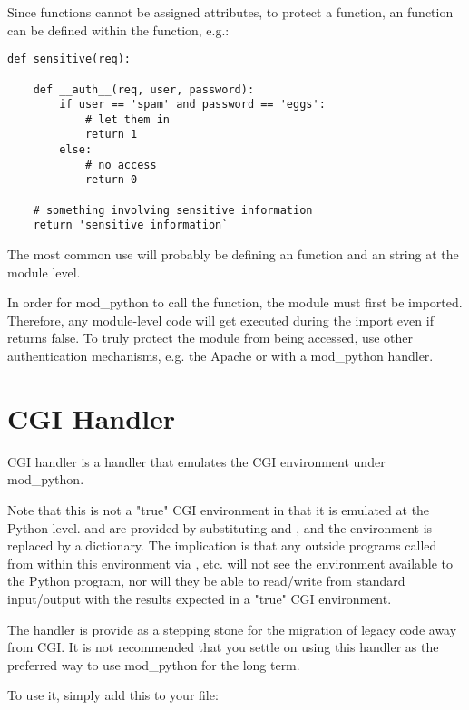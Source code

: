 Since functions cannot be assigned attributes, to protect a function,
an  function can be defined within the function, e.g.:

\begin{verbatim}
def sensitive(req):

    def __auth__(req, user, password):
        if user == 'spam' and password == 'eggs':
            # let them in
            return 1
        else:
            # no access
            return 0

    # something involving sensitive information
    return 'sensitive information`
\end{verbatim}

The most common use will probably be defining an 
function and an  string at the module level. 

 In order for mod_python to call the 
function, the module must first be imported. Therefore, any
module-level code will get executed during the import even if
 returns false.  To truly protect the module from
being accessed, use other authentication mechanisms, e.g. the Apache
 or with a mod_python  handler.

\section{CGI Handler\label{hand-cgi}}


CGI handler is a handler that emulates the CGI environment under mod_python. 

Note that this is not a "true" CGI environment in that it is emulated
at the Python level.  and  are provided by
substituting  and , and the environment
is replaced by a dictionary. The implication is that any outside programs
called from within this environment via , etc. will
not see the environment available to the Python program, nor will they
be able to read/write from standard input/output with the results expected
in a "true" CGI environment.

The handler is provide as a stepping stone for the migration of legacy
code away from CGI. It is not recommended that you settle on using
this handler as the preferred way to use mod_python for the long term.

To use it, simply add this to your  file: 

